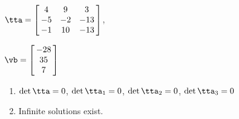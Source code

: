 {$\tta = \left[\hskip -3pt \begin{array}{ccc} 4&9&3\\  -5&-2&-13
\\  -1&10&-13\end{array}\hskip -3pt \right] $,

$\vb = \left[\hskip -3pt \begin{array}{c} -28\\  35
\\  7\end{array}\hskip -3pt \right]$}
{\begin{enumerate}
\item	$\det{\tta} = 0$, $\det{\tta_1} = 0$, $\det{\tta_2} = 0$, $\det{\tta_3} = 0$
\item Infinite solutions exist.
\end{enumerate}
}

 


